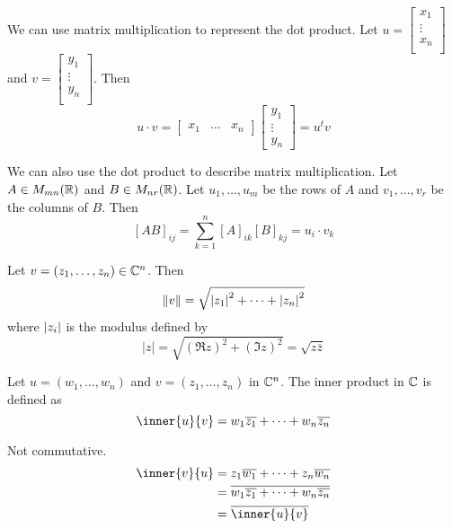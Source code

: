 \documentclass{article}
\begin{document}
    \begin{corollary}
      We can use matrix multiplication to represent the dot product. Let $u =
      \begin{bmatrix}
        x_1\\
        \vdots\\
        x_n\\
      \end{bmatrix}$ and $v =
      \begin{bmatrix}
        y_1\\
        \vdots\\
        y_n\\
      \end{bmatrix}$. Then \[
        u \cdot v =
        \begin{bmatrix}
          x_1 &\dots & x_n
        \end{bmatrix}
        \begin{bmatrix}
          y_1\\\vdots\\y_n
        \end{bmatrix} = u^tv
      \]

      We can also use the dot product to describe matrix multiplication. Let $A \in M_{mn}(\mathbb{R})$ and $B \in M_{nr}(\mathbb{R})$. Let $u_1, \ldots, u_m$ be the rows of $A$ and $v_1, \ldots, v_r$ be the columns of $B$.
      Then \[
        [AB]_{ij} = \sum_{k=1}^n [A]_{ik}[B]_{kj} = u_i \cdot v_k
      \]
    \end{corollary}
    \begin{definition}
      Let $v = (z_1, \ldots, z_n) \in \mathbb{C}^n$. Then \[
        \norm{v} = \sqrt{\abs{z_1}^2 + \dots + \abs{z_n}^2}
      \] where $\abs{z_i}$ is the modulus defined by \[
        |z| = \sqrt{(\Re z)^2 + (\Im z)^2} = \sqrt{z\overline{z}}
      \]
    \end{definition}
    \begin{definition}
      Let $u = (w_1, \ldots, w_n)$ and $v = (z_1, \ldots, z_n)$ in $\mathbb{C}^n$. The inner product in $\mathbb{C}$ is defined as \[
        \inner{u}{v} =  w_1\overline{z_1} + \dots + w_n\overline{z_n}
      \]
    \end{definition}
    \begin{corollary}
      Not commutative.
      \begin{align*}
        \inner{v}{u} &= z_1\overline{w_1} + \dots + z_n\overline{w_n}\\
        &= \overline{w_1\overline{z_1} + \dots + w_n\overline{z_n}}\\
        &= \overline{\inner{u}{v}}
      \end{align*}
    \end{corollary}
\end{document}
